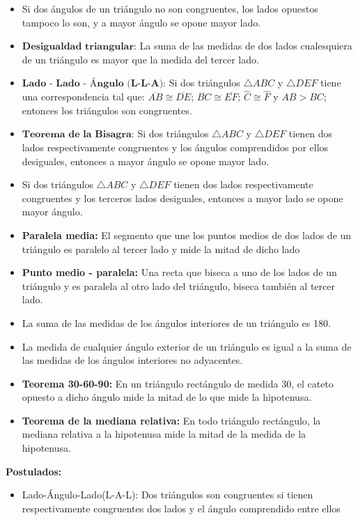\documentclass[•]{article}
\begin{document}
\begin{itemize}
	\item Si dos \'angulos de un tri\'angulo no son congruentes, los lados opuestos tampoco lo son, y a mayor \'angulo se opone mayor lado.
	\item $\textbf{Desigualdad triangular}$: La suma de las medidas  de dos lados cualesquiera de un tri\'angulo es mayor que la medida del tercer lado.
	\item $\textbf{Lado - Lado - \'Angulo (L-L-A)}$: Si dos tri\'angulos $\bigtriangleup ABC$ y $\bigtriangleup DEF$ tiene una correspondencia tal que: $\overline{AB} \cong \overline{DE}$; $\overline{BC} \cong \overline{EF}$; $\hat{C} \cong \hat{F}$ y $AB > BC$; entonces los tri\'angulos son congruentes.
	\item $\textbf{Teorema de la Bisagra}$: Si dos tri\'angulos $\bigtriangleup ABC$ y $\bigtriangleup DEF$ tienen dos lados respectivamente congruentes y los \'angulos comprendidos por ellos desiguales, entonces a mayor \'angulo se opone mayor lado.
	\item Si dos tri\'angulos $\bigtriangleup ABC$ y $\bigtriangleup DEF$ tienen dos lados respectivamente congruentes y los terceros lados desiguales, entonces a mayor lado se opone mayor \'angulo.
	
	\item \textbf{Paralela media:} El segmento que une los puntos medios de dos lados de un tri\'angulo es paralelo al tercer lado y mide la mitad de dicho lado
	\item \textbf{Punto medio - paralela: }Una recta que biseca a uno de los lados de un tri\'angulo y es paralela al otro lado del tri\'angulo, biseca tambi\'en al tercer lado.
	\item La suma de las medidas de los \'angulos interiores de un tri\'angulo es 180.
	\item La medida de cualquier \'angulo exterior de un tri\'angulo es igual a la suma de las medidas de los \'angulos interiores no adyacentes.
	\item \textbf{Teorema 30-60-90: }En un tri\'angulo rect\'angulo de medida 30, el cateto opuesto a dicho \'angulo mide la mitad de lo que mide la hipotenusa.
	\item \textbf{Teorema de la mediana relativa: }En todo tri\'angulo rect\'angulo, la mediana relativa a la hipotenusa mide la mitad de la medida de la hipotenusa.

\end{itemize}

\textbf{Postulados:}
\begin{itemize}
	\item Lado-\'Angulo-Lado(L-A-L): Dos tri\'angulos son congruentes si tienen respectivamente congruentes dos lados y el \'angulo comprendido entre ellos

\end{itemize}
\end{document}
